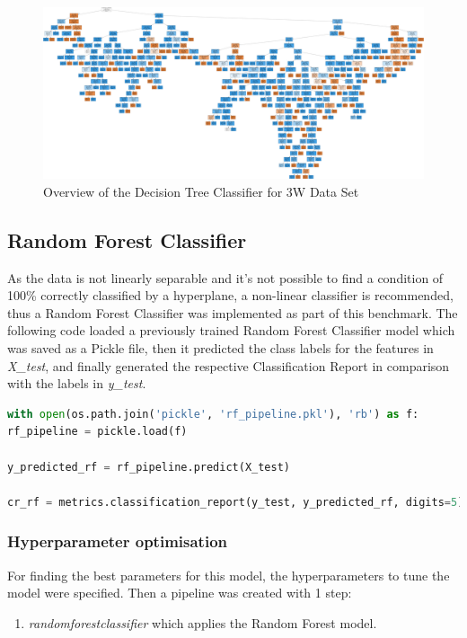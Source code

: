 \documentclass{article}
\begin{document}
\begin{figure}
\centering
\includegraphics[width=1\textwidth]{decision_tree.png}
\caption{\label{fig:decision_tree}Overview of the Decision Tree Classifier for 3W Data Set}
\end{figure}

\subsection{Random Forest Classifier} 
As the data is not linearly separable and it's not possible to find a condition of 100\% correctly classified by a hyperplane, a non-linear classifier is recommended, thus a Random Forest Classifier was implemented as part of this benchmark. The following code loaded a previously trained Random Forest Classifier model which was saved as a Pickle file, then it predicted the class labels for the features in \emph{X\_test}, and finally generated the respective Classification Report in comparison with the labels in \emph{y\_test}.

\begin{lstlisting}[language=python]
with open(os.path.join('pickle', 'rf_pipeline.pkl'), 'rb') as f:    
rf_pipeline = pickle.load(f)
    
y_predicted_rf = rf_pipeline.predict(X_test)

cr_rf = metrics.classification_report(y_test, y_predicted_rf, digits=5)
\end{lstlisting}

\subsubsection{Hyperparameter optimisation}
For finding the best parameters for this model, the hyperparameters to tune the model were specified. Then a pipeline was created with 1 step:
\begin{enumerate}
\item \emph{randomforestclassifier} which applies the Random Forest model.
\end{enumerate}
\end{document}
